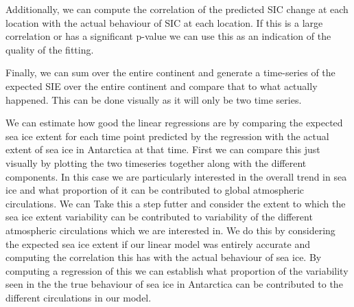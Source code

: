 Additionally, we can compute the correlation of the predicted SIC change at each location with the actual behaviour of SIC at each location. If this is a large correlation or has a significant p-value we can use this as an indication of the quality of the fitting.

Finally, we can sum over the entire continent and generate a time-series of the expected SIE over the entire continent and compare that to what actually happened. This can be done visually as it will only be two time series. 

We can estimate how good the linear regressions are by comparing the expected sea ice extent for each time point predicted by the regression with the actual extent of sea ice in Antarctica at that time. First we can compare this just visually by plotting the two timeseries together along with the different components. In this case we are particularly interested in the overall trend in sea ice and what proportion of it can be contributed to global atmospheric circulations. We can Take this a step futter and consider the extent to which the sea ice extent variability can be contributed to variability of the different atmospheric circulations which we are interested in. We do this by considering the expected sea ice extent if our linear model was entirely accurate and computing the correlation this has with the actual behaviour of sea ice. By computing a regression of this we can establish what proportion of the variability seen in the the true behaviour of sea ice in Antarctica can be contributed to the different circulations in our model.